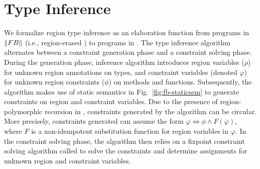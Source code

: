 \section{Type Inference}
\label{sec:type-inference}

We formalize region type inference as an elaboration function from
programs in $\left\| {\sc FB} \right\|$ (i.e., region-erased \FB) to programs in
\FB.  The type inference algorithm alternates between a constraint
generation phase and a constraint solving phase. During the generation
phase, inference algorithm introduces region variables ($\rho$) for
unknown region annotations on types, and constraint variables (denoted
$\varphi$) for unknown region constraints ($\phi$) on methods and
functions. Subsequently, the algorithm makes use of static semantics
in Fig.~\ref{fig:fb-staticsem} to generate constraints on region and
constraint variables. Due to the presence of region-polymorphic
recursion in \FB, constraints generated by the algorithm can be
circular. More precisely, constraints generated can assume the form
$\varphi \Leftrightarrow \phi \wedge F(\varphi)$, where $F$ is a
non-idempotent substitution function for region variables in
$\varphi$. In the constraint solving phase, the algorithm then relies
on a fixpoint constraint solving algorithm called \csolvestar to solve
the constraints and determine assignments for unknown region and
constraint variables.


